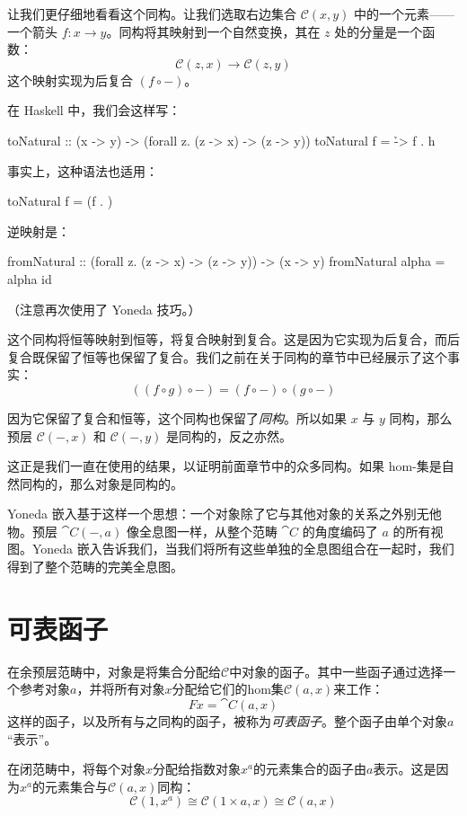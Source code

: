 \documentclass[DaoFP]{subfiles}
\begin{document}
让我们更仔细地看看这个同构。让我们选取右边集合 $\mathcal{C}(x, y)$ 中的一个元素——一个箭头 $f \colon x \to y$。同构将其映射到一个自然变换，其在 $z$ 处的分量是一个函数：
\[ \mathcal{C}(z, x) \to \mathcal{C}(z, y) \]
这个映射实现为后复合 $(f \circ -)$。

在 Haskell 中，我们会这样写：
\begin{haskell}
toNatural :: (x -> y) -> (forall z. (z -> x) -> (z -> y))
toNatural f = \h -> f . h 
\end{haskell}
事实上，这种语法也适用：
\begin{haskell}
toNatural f = (f . )
\end{haskell}
逆映射是：
\begin{haskell}
fromNatural :: (forall z. (z -> x) -> (z -> y)) -> (x -> y)
fromNatural alpha = alpha id
\end{haskell}
（注意再次使用了 Yoneda 技巧。）

这个同构将恒等映射到恒等，将复合映射到复合。这是因为它实现为后复合，而后复合既保留了恒等也保留了复合。我们之前在关于同构的章节中已经展示了这个事实：
\[ ((f \circ g) \circ -) = (f \circ -) \circ (g \circ -) \]

因为它保留了复合和恒等，这个同构也保留了\emph{同构}。所以如果 $x$ 与 $y$ 同构，那么预层 $ \mathcal{C}(-, x)$ 和 $ \mathcal{C}(-, y)$ 是同构的，反之亦然。

这正是我们一直在使用的结果，以证明前面章节中的众多同构。如果 hom-集是自然同构的，那么对象是同构的。

Yoneda 嵌入基于这样一个思想：一个对象除了它与其他对象的关系之外别无他物。预层 $\cat C (-, a)$ 像全息图一样，从整个范畴 $\cat C$ 的角度编码了 $a$ 的所有视图。Yoneda 嵌入告诉我们，当我们将所有这些单独的全息图组合在一起时，我们得到了整个范畴的完美全息图。

\section{可表函子}

在余预层范畴中，对象是将集合分配给$\mathcal{C}$中对象的函子。其中一些函子通过选择一个参考对象$a$，并将所有对象$x$分配给它们的hom集$\mathcal{C}(a, x)$来工作：
\[ F x = \cat C(a, x) \]
这样的函子，以及所有与之同构的函子，被称为\emph{可表函子}。整个函子由单个对象$a$“表示”。

在闭范畴中，将每个对象$x$分配给指数对象$x^a$的元素集合的函子由$a$表示。这是因为$x^a$的元素集合与$\mathcal{C}(a, x)$同构：
\[\mathcal{C}(1, x^a) \cong \mathcal{C}(1 \times a, x) \cong \mathcal{C} (a, x)\]
\end{document}

